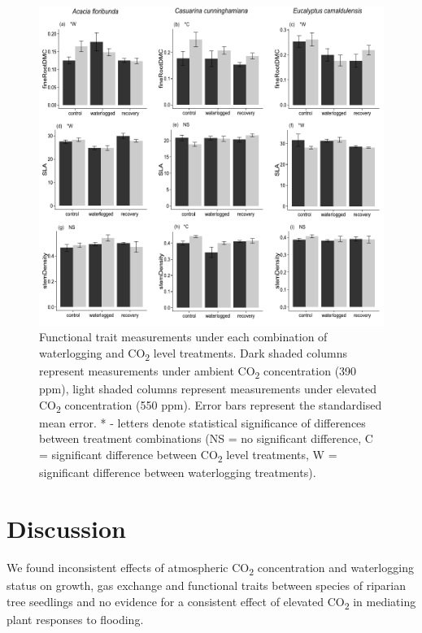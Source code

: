 \documentclass[openright,12pt,a4paper]{memoir}
\begin{document}
\begin{figure}[h!]
\begin{center}
\includegraphics[width=\linewidth,keepaspectratio=true]{traits.pdf} %
\caption[Functional trait measurements under each combination of waterlogging and CO\textsubscript{2} level treatments.]{\small{Functional trait measurements under each combination of waterlogging and CO\textsubscript{2} level treatments. Dark shaded columns represent measurements under ambient CO\textsubscript{2} concentration (390 ppm), light shaded columns represent measurements under elevated CO\textsubscript{2} concentration (550 ppm). Error bars represent the standardised mean error. * - letters denote statistical significance of differences between treatment combinations (NS = no significant difference, C = significant difference between CO\textsubscript{2} level treatments, W = significant difference between waterlogging treatments).}} %
\label{Ch5_F3} %
\end{center}
\end{figure}
\section{Discussion}
We found inconsistent effects of atmospheric CO\textsubscript{2} concentration and waterlogging status on growth, gas exchange and functional traits between species of riparian tree seedlings and no evidence for a consistent effect of elevated CO\textsubscript{2} in mediating plant responses to flooding. 
\end{document}

